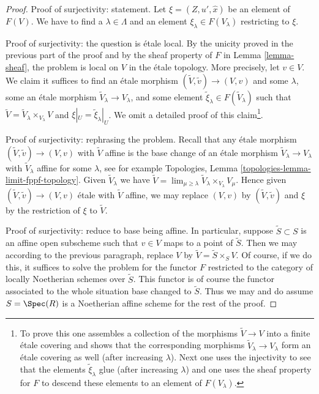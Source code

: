 \begin{proof}
\medskip\noindent
Proof of surjectivity: statement.
Let $\xi = (Z, u', \hat x)$ be an element of $F(V)$.
We have to find a $\lambda \in \Lambda$ and an element
$\xi_\lambda \in F(V_\lambda)$ restricting to $\xi$.

\medskip\noindent
Proof of surjectivity: the question is \'etale local.
By the unicity proved in the previous part of the proof and by the
sheaf property of $F$ in Lemma \ref{lemma-sheaf}, the problem
is local on $V$ in the \'etale topology. More precisely, let $v \in V$.
We claim it suffices to find an \'etale morphism
$(\tilde V, \tilde v) \to (V, v)$ and some
$\lambda$, some an \'etale morphism $\tilde V_\lambda \to V_\lambda$,
and some element $\tilde \xi_\lambda \in F(\tilde V_\lambda)$ such that
$\tilde V = \tilde V_\lambda \times_{V_\lambda} V$
and $\xi|_U = \tilde \xi_\lambda|_U$. We omit a detailed proof of
this claim\footnote{To prove this
one assembles a collection of the morphisms $\tilde V \to V$
into a finite \'etale covering and shows that the corresponding morphisms
$\tilde V_\lambda \to V_\lambda$ form an \'etale covering as well (after
increasing $\lambda$). Next one uses the injectivity to see that
the elements $\tilde \xi_\lambda$ glue (after increasing $\lambda$)
and one uses the sheaf property for $F$ to descend these
elements to an element of $F(V_\lambda)$.}.

\medskip\noindent
Proof of surjectivity: rephrasing the problem.
Recall that any \'etale morphism $(\tilde V, \tilde v) \to (V, v)$
with $\tilde V$ affine is the base change of an \'etale morphism
$\tilde V_\lambda \to V_\lambda$ with $\tilde V_\lambda$ affine
for some $\lambda$, see for example
Topologies, Lemma \ref{topologies-lemma-limit-fppf-topology}.
Given $\tilde V_\lambda$ we have
$\tilde V = \lim_{\mu \geq \lambda} \tilde V_\lambda \times_{V_\lambda} V_\mu$.
Hence given $(\tilde V, \tilde v) \to (V, v)$ \'etale with $\tilde V$ affine,
we may replace $(V, v)$ by $(\tilde V, \tilde v)$ and $\xi$ by
the restriction of $\xi$ to $\tilde V$.

\medskip\noindent
Proof of surjectivity: reduce to base being affine. In particular,
suppose $\tilde S \subset S$ is an affine open subscheme such
that $v \in V$ maps to a point of $\tilde S$. Then we may according
to the previous paragraph, replace $V$ by $\tilde V = \tilde S \times_S V$.
Of course, if we do this, it suffices to solve the problem
for the functor $F$ restricted to the category of locally Noetherian
schemes over $\tilde S$. This functor is of course the functor
associated to the whole situation base changed to $\tilde S$.
Thus we may and do assume $S = \Spec(R)$ is a Noetherian affine scheme
for the rest of the proof.


\end{proof}
